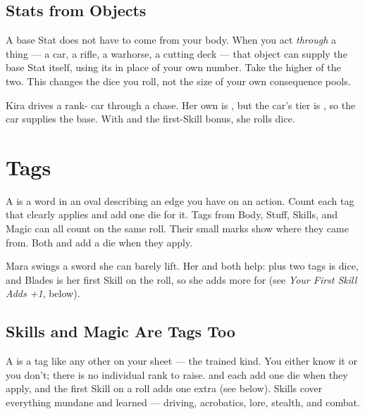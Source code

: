 \subsection*{Stats from Objects}
A base Stat does not have to come from your body. When you act
\emph{through} a thing --- a car, a rifle, a warhorse, a cutting deck ---
that object can supply the base Stat itself, using its  in
place of your own number. Take the higher of the two. This changes the
dice you roll, not the size of your own consequence pools.

\begin{example}
Kira drives a rank- car through a chase. Her own  is
, but the car's tier is , so the car supplies the base. With
 and the first-Skill bonus, she rolls  dice.
\end{example}

\section{Tags}
A  is a word in an oval describing an edge you have on an
action. Count each tag that clearly applies and add one die for it. Tags
from Body, Stuff, Skills, and Magic can all count on the same roll. Their
small marks show where they came from. Both  and
 add a die when they apply.

\begin{example}
Mara swings a sword she can barely lift. Her  and
 both help:   plus two tags
is  dice, and Blades is her first Skill on the roll, so she adds
 more for  (see \emph{Your First Skill Adds +1}, below).
\end{example}

\subsection*{Skills and Magic Are Tags Too}
A  is a tag like any other on your sheet --- the trained
kind. You either know it or you don't; there is no individual rank to
raise.  and  each add
one die when they apply, and the first Skill on a roll adds one extra
(see below). Skills cover everything mundane and
learned --- driving, acrobatics, lore, stealth, and combat.

